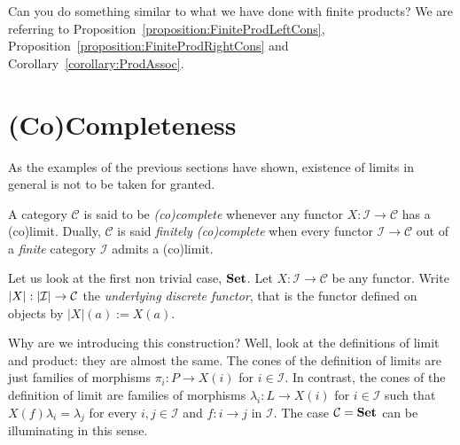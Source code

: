 \begin{exercise}
  Can you do something similar to what we have done with finite
  products? We are referring to
  Proposition~\ref{proposition:FiniteProdLeftCons},
  Proposition~\ref{proposition:FiniteProdRightCons} and
  Corollary~\ref{corollary:ProdAssoc}.
\end{exercise}



\section{(Co)Completeness}

As the examples of the previous sections have shown, existence of limits
in general is not to be taken for granted.

\begin{definition}
  A category \(\mathcal{C}\) is said to be {\em (co)complete} whenever any functor
  \(X : \mathcal{I} \to \mathcal{C}\) has a (co)limit. Dually,
  \(\mathcal{C}\) is said {\em finitely (co)complete} when every functor
  \(\mathcal{I} \to \mathcal{C}\) out of a {\em finite} category \(\mathcal{I}\) admits a (co)limit.
\end{definition}

Let us look at the first non trivial case, \(\mathbf{Set}\). Let \(X : \mathcal{I} \to \mathcal{C}\)
be any functor. Write \(\left\lvert X \right\rvert : \left\lvert\mathcal{I}\right\rvert \to \mathcal{C}\) the
{\em underlying discrete functor}, that is the functor defined on objects by \(\left\lvert X
\right\rvert (a) :=  X(a)\).

Why are we introducing this construction? Well, look at the definitions
of limit and product: they are almost the same. The cones of the
definition of limits are just families of morphisms \(\pi_i : P \to X(i)\) for \(i
\in \mathcal{I}\). In contrast, the cones of the definition of limit are families of
morphisms \(\lambda_i : L \to X(i)\) for \(i \in \mathcal{I}\) such that \(X(f) \lambda_i = \lambda_j\)
for every \(i, j \in \mathcal{I}\) and \(f : i \to j\) in \(\mathcal{I}\). The case
\(\mathcal{C} = \mathbf{Set}\) can be illuminating in this sense. 

